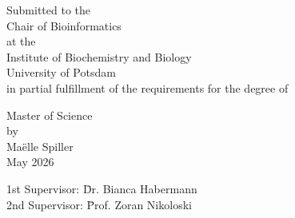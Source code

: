 \begin{center}
    \vspace{2.0cm}
    {\large Submitted to the}\\
    {\large Chair of Bioinformatics}\\
    {\large at the}\\
    {\large Institute of Biochemistry and Biology}\\    
    {\large University of Potsdam}\\
    \vspace{0.5cm}
    {\large in partial fulfillment of the requirements for the degree of}\\
    \vspace{1cm}
    
    {\Large  Master of Science}\\
    \vspace{0.5cm}
    {\large by}\\
    \vspace{2mm}
    \Large{Maëlle Spiller}\\
    \vspace{1cm}
    {\small May 2026}
    \vspace{1cm}
  \centering
  \begin{large}
    \begin{tabbing}
      1st Supervisor: \= Dr. Bianca Habermann\\
      2nd Supervisor: \= Prof. Zoran Nikoloski
    \end{tabbing}
  \end{large}
  \vspace{1.5mm} 

  \end{center}

\newpage
